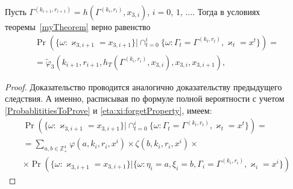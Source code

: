 \documentclass[a4paper,12pt,russian]{extarticle}
\begin{document}
\begin{corollary}
Пусть $\Gamma^{(k_{i+1},r_{i+1})}=h(\Gamma^{(k_i,r_i)},x_{3,i})$, $i=0$, $1$, $\ldots$. Тогда в условиях теоремы~\ref{myTheorem} верно равенство
\begin{multline}
\Pr (\{ \omega \colon \varkappa_{3,i+1} = x_{3,i+1}\} |\cap_{t=0}^{i}\{\omega\colon \Gamma_t=\Gamma^{(k_t,r_t)}, \varkappa_t=x^t\})=\\
=\widetilde{\varphi}_3(k_{i+1},r_{i+1},h_T(\Gamma^{(k_i,r_i)},x_{3,i}),x_{3,i},x_{3,i+1}),
\label{kappa:3:conditional}
\end{multline}
\end{corollary}
\begin{proof}
Доказательство проводится аналогично доказательству предыдущего следствия. А именно, расписывая по формуле полной вероятности с учетом \eqref{ProbablititiesToProve} и \eqref{eta:xi:forgetProperty}, имеем:
\begin{multline*}
\Pr (\{ \omega \colon \varkappa_{3,i+1} = x_{3,i+1}\} |\cap_{t=0}^{i}\{\omega\colon \Gamma_t=\Gamma^{(k_t,r_t)}, \varkappa_t=x^t\})=\\
= \sum_{a,b\in \mathbb{Z}_+^4} \varphi(a,k_i,r_i,x^i)\times\zeta(b,k_i,r_i,x^i) \times\\
\times \Pr (\{ \omega \colon \varkappa_{3,i+1} = x_{3,i+1}\} |\{\omega\colon \eta_i=a, \xi_i=b, \Gamma_i=\Gamma^{(k_i,r_i)}, \varkappa_i=x^i\})
\end{multline*}


\end{proof}
\end{document}
